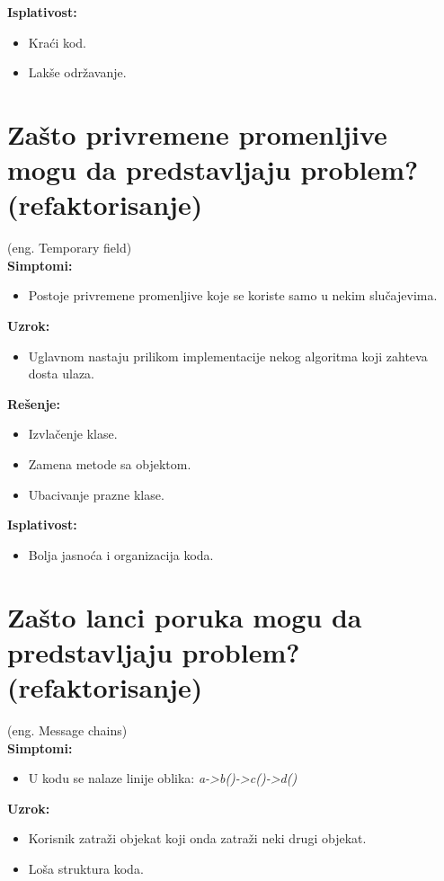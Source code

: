 \documentclass[a4paper]{article}
\begin{document}
  \noindent \textbf{Isplativost:} 
  \begin{itemize}
    \item Kraći kod.
    \item Lakše održavanje.
  \end{itemize}

\section{Zašto privremene promenljive mogu da predstavljaju problem? (refaktorisanje)}
  (eng. Temporary field)\\
  \textbf{Simptomi:}
  \begin{itemize}
    \item Postoje privremene promenljive koje se koriste samo u nekim slučajevima.
  \end{itemize}

  \noindent \textbf{Uzrok:} 
  \begin{itemize}
    \item Uglavnom nastaju prilikom implementacije nekog algoritma koji zahteva dosta ulaza.
  \end{itemize}

  \noindent \textbf{Rešenje:} 
  \begin{itemize}
    \item Izvlačenje klase.
    \item Zamena metode sa objektom.
    \item Ubacivanje prazne klase.
  \end{itemize}

  \noindent \textbf{Isplativost:} 
  \begin{itemize}
    \item Bolja jasnoća i organizacija koda.
  \end{itemize}

\section{Zašto lanci poruka mogu da predstavljaju problem? (refaktorisanje)}
  (eng. Message chains)\\
  \textbf{Simptomi:}
  \begin{itemize}
    \item U kodu se nalaze linije oblika: \textit{a->b()->c()->d()}
  \end{itemize}

  \noindent \textbf{Uzrok:} 
  \begin{itemize}
    \item Korisnik zatraži objekat koji onda zatraži neki drugi objekat.
    \item Loša struktura koda.
  \end{itemize}
\end{document}
